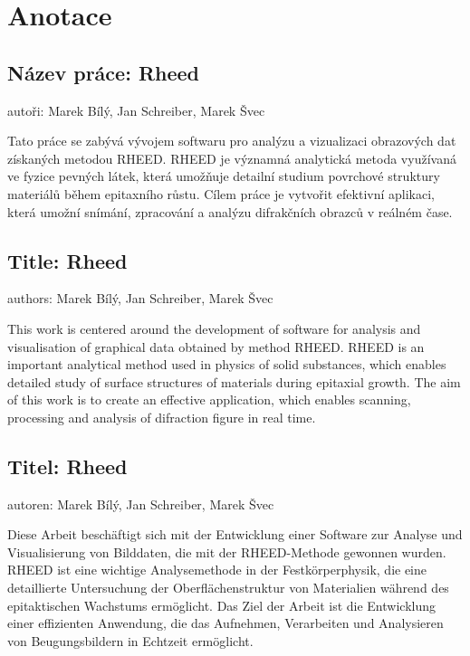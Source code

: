 \documentclass{article}
\begin{document}
\section*{Anotace}

\subsection*{Název práce: Rheed}
autoři: Marek Bílý, Jan Schreiber, Marek Švec
\vspace{0.5cm}

Tato práce se zabývá vývojem softwaru pro analýzu a vizualizaci obrazových dat získaných metodou RHEED. RHEED je významná analytická metoda využívaná ve fyzice pevných látek, která umožňuje detailní studium povrchové struktury materiálů během epitaxního růstu. Cílem práce je vytvořit efektivní aplikaci, která umožní snímání, zpracování a analýzu difrakčních obrazců v reálném čase.

\subsection*{Title: Rheed}
authors: Marek Bílý, Jan Schreiber, Marek Švec
\vspace{0.5cm}

This work is centered around the development of software for analysis and visualisation of graphical data obtained by method RHEED. RHEED is an important analytical method used in physics of solid substances, which enables detailed study of surface structures of materials during epitaxial growth. The aim of this work is to create an effective application, which enables scanning, processing and analysis of difraction figure in real time.

\subsection*{Titel: Rheed}
autoren: Marek Bílý, Jan Schreiber, Marek Švec
\vspace{0.5cm}

Diese Arbeit beschäftigt sich mit der Entwicklung einer Software zur Analyse und Visualisierung von Bilddaten, die mit der RHEED-Methode gewonnen wurden. RHEED ist eine wichtige Analysemethode in der Festkörperphysik, die eine detaillierte Untersuchung der Oberflächenstruktur von Materialien während des epitaktischen Wachstums ermöglicht. Das Ziel der Arbeit ist die Entwicklung einer effizienten Anwendung, die das Aufnehmen, Verarbeiten und Analysieren von Beugungsbildern in Echtzeit ermöglicht. 
\newpage
\end{document}
